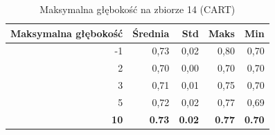 \begin{table}[htbp]
\centering
\small
\setlength{\tabcolsep}{6pt}
\renewcommand{\arraystretch}{1.2}
\caption{Maksymalna głębokość na zbiorze 14 (CART)}
\label{tab:CART_max_depth_14}
\begin{tabular}{r|r|r|r|r}
\toprule
Maksymalna głębokość & Średnia & Std & Maks & Min \\
\hline
-1 & 0,73 & 0,02 & 0,80 & 0,70 \\
2 & 0,70 & 0,00 & 0,70 & 0,70 \\
3 & 0,71 & 0,01 & 0,75 & 0,70 \\
5 & 0,72 & 0,02 & 0,77 & 0,69 \\
\textbf{10} & \textbf{0.73} & \textbf{0.02} & \textbf{0.77} & \textbf{0.70} \\
\bottomrule
\end{tabular}
\end{table}